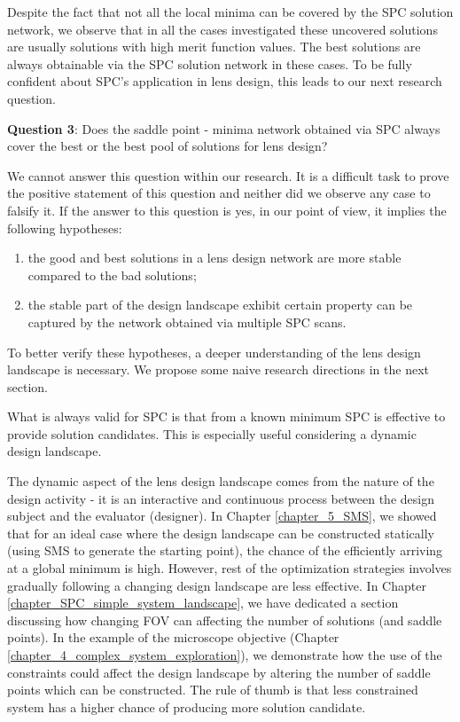 Despite the fact that not all the local minima can be covered by the SPC solution network, we observe that in all the cases investigated these uncovered solutions are usually solutions with high merit function values. The best solutions are always obtainable via the SPC solution network in these cases. To be fully confident about SPC's application in lens design, this leads to our next research question.

\vspace{1em}

\textbf{Question 3}: Does the saddle point - minima network obtained via SPC always cover the best or the best pool of solutions for lens design? 

We cannot answer this question within our research. It is a difficult task to prove the positive statement of this question and neither did we observe any case to falsify it. If the answer to this question is yes, in our point of view, it implies the following hypotheses:

\begin{enumerate}[nosep]
\item the good and best solutions in a lens design network are more stable compared to the bad solutions;
\item the stable part of the design landscape exhibit certain property can be captured by the network obtained via multiple SPC scans.
\end{enumerate}


To better verify these hypotheses, a deeper understanding of the lens design landscape is necessary. We propose some naive research directions in the next section. 

\vspace{1em}

What is always valid for SPC is that from a known minimum SPC is effective to provide solution candidates. This is especially useful considering a dynamic design landscape. 

The dynamic aspect of the lens design landscape comes from the nature of the design activity - it is an interactive and continuous process between the design subject and the evaluator (designer). In Chapter \ref{chapter_5_SMS}, we showed that for an ideal case where the design landscape can be constructed statically (using SMS to generate the starting point), the chance of the efficiently arriving at a global minimum is high. However, rest of the optimization strategies involves gradually following a changing design landscape are less effective. In Chapter \ref{chapter_SPC_simple_system_landscape}, we have dedicated a section discussing how changing FOV can affecting the number of solutions (and saddle points). In the example of the microscope objective (Chapter \ref{chapter_4_complex_system_exploration}), we demonstrate how the use of the constraints could affect the design landscape by altering the number of saddle points which can be constructed. The rule of thumb is that less constrained system has a higher chance of producing more solution candidate. 

